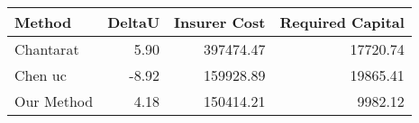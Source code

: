 \begin{tabular}{lrrr}
\toprule
Method & DeltaU & Insurer Cost & Required Capital \\
\midrule
Chantarat & 5.90 & 397474.47 & 17720.74 \\
Chen uc & -8.92 & 159928.89 & 19865.41 \\
Our Method & 4.18 & 150414.21 & 9982.12 \\
\bottomrule
\end{tabular}
